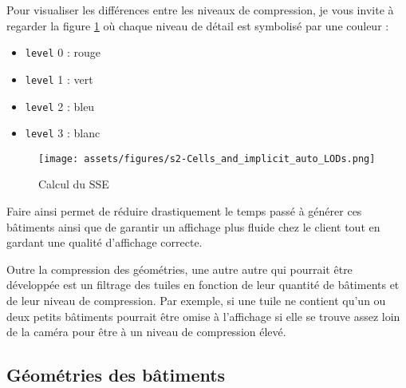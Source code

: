 Pour visualiser les différences entre les niveaux de compression, je vous invite à regarder la figure \ref{fig:lods-colors} où chaque niveau de détail est symbolisé par une couleur :

\begin{itemize}
    \item \texttt{level} 0 : rouge
    \item \texttt{level} 1 : vert
    \item \texttt{level} 2 : bleu
    \item \texttt{level} 3 : blanc
\end{itemize}


\begin{figure}[H]
    \centering
    \texttt{[image: assets/figures/s2-Cells\_and\_implicit\_auto\_LODs.png]}
    \caption{Calcul du SSE \cite{3d-tiles-specification}}
    \label{fig:lods-colors}
\end{figure}

Faire ainsi permet de réduire drastiquement le temps passé à générer ces bâtiments ainsi que de garantir un affichage plus fluide chez le client tout en gardant une qualité d'affichage correcte.

Outre la compression des géométries, une autre autre qui pourrait être développée est un filtrage des tuiles en fonction de leur quantité de bâtiments et de leur niveau de compression. Par exemple, si une tuile ne contient qu'un ou deux petits bâtiments pourrait être omise à l'affichage si elle se trouve assez loin de la caméra pour être à un niveau de compression élevé.

\subsection{Géométries des bâtiments}

